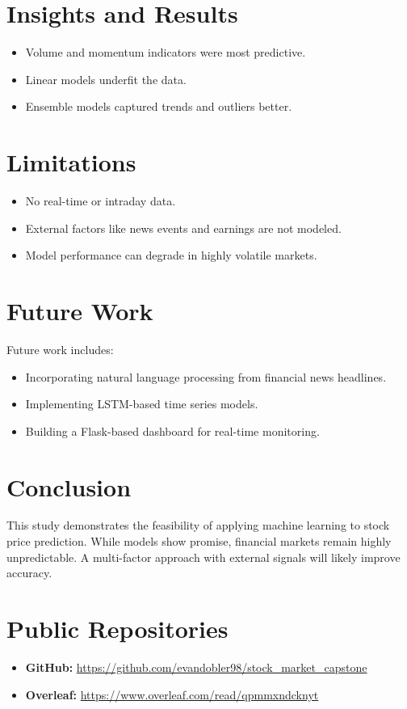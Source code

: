 \documentclass[runningheads]{llncs}
\begin{document}
\section{Insights and Results}
\begin{itemize}
    \item Volume and momentum indicators were most predictive.
    \item Linear models underfit the data.
    \item Ensemble models captured trends and outliers better.
\end{itemize}

\section{Limitations}
\begin{itemize}
    \item No real-time or intraday data.
    \item External factors like news events and earnings are not modeled.
    \item Model performance can degrade in highly volatile markets.
\end{itemize}

\section{Future Work}
Future work includes:
\begin{itemize}
    \item Incorporating natural language processing from financial news headlines.
    \item Implementing LSTM-based time series models.
    \item Building a Flask-based dashboard for real-time monitoring.
\end{itemize}

\section{Conclusion}
This study demonstrates the feasibility of applying machine learning to stock price prediction. While models show promise, financial markets remain highly unpredictable. A multi-factor approach with external signals will likely improve accuracy.

\section*{Public Repositories}
\begin{itemize}
    \item \textbf{GitHub:} \url{https://github.com/evandobler98/stock_market_capstone}
    \item \textbf{Overleaf:} \url{https://www.overleaf.com/read/qpmmxndcknyt}
\end{itemize}
\end{document}
